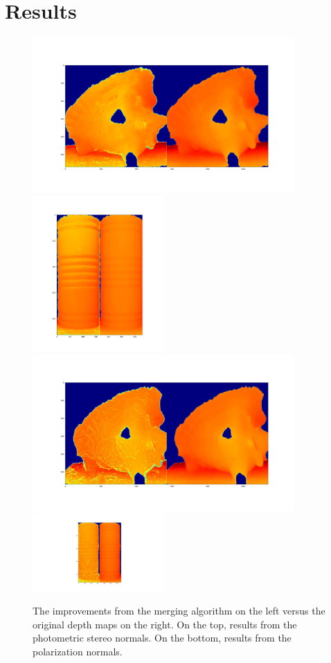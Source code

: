 \documentclass[final]{cvpr}
\begin{document}
\section{Results}
\begin{figure}
	\begin{center}
	\includegraphics[width=10cm]{ps_conch}
	\includegraphics[width=5cm]{ps_roller}
	\includegraphics[width=10cm]{sfp_conch}
	\includegraphics[width=5cm]{sfp_roller}
	\caption{The improvements from the merging algorithm on the left versus the original depth maps on the right. On the top, results from the photometric stereo normals. On the bottom, results from the polarization normals.}	
	\end{center}
\end{figure}
\end{document}
